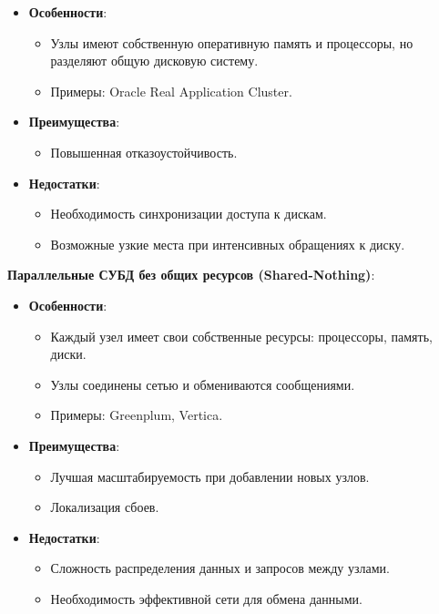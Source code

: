 \documentclass[a4paper,12pt]{article}
\begin{document}
\begin{itemize}
    \item \textbf{Особенности}:
    \begin{itemize}
        \item Узлы имеют собственную оперативную память и процессоры, но разделяют общую дисковую систему.
        \item Примеры: Oracle Real Application Cluster.
    \end{itemize}
    \item \textbf{Преимущества}:
    \begin{itemize}
        \item Повышенная отказоустойчивость.
    \end{itemize}
    \item \textbf{Недостатки}:
    \begin{itemize}
        \item Необходимость синхронизации доступа к дискам.
        \item Возможные узкие места при интенсивных обращениях к диску.
    \end{itemize}
\end{itemize}

\textbf{Параллельные СУБД без общих ресурсов (Shared-Nothing)}:

\begin{itemize}
    \item \textbf{Особенности}:
    \begin{itemize}
        \item Каждый узел имеет свои собственные ресурсы: процессоры, память, диски.
        \item Узлы соединены сетью и обмениваются сообщениями.
        \item Примеры: Greenplum, Vertica.
    \end{itemize}
    \item \textbf{Преимущества}:
    \begin{itemize}
        \item Лучшая масштабируемость при добавлении новых узлов.
        \item Локализация сбоев.
    \end{itemize}
    \item \textbf{Недостатки}:
    \begin{itemize}
        \item Сложность распределения данных и запросов между узлами.
        \item Необходимость эффективной сети для обмена данными.
    \end{itemize}
\end{itemize}
\end{document}

